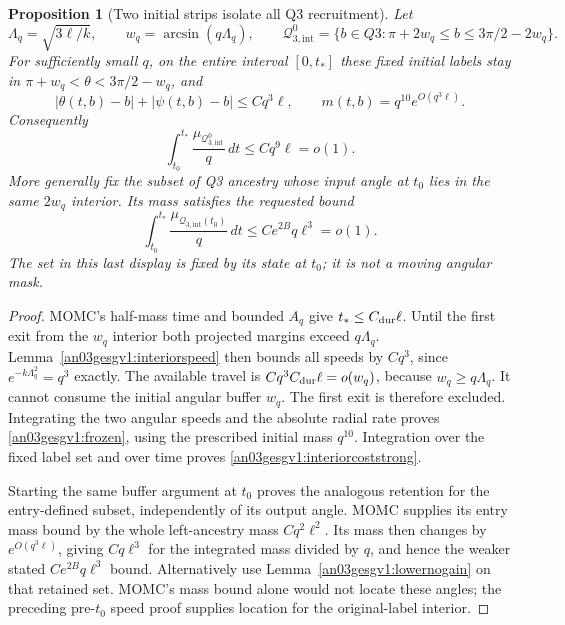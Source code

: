 \documentclass[11pt]{article}
\newtheorem{proposition}{Proposition}[section]
\theoremstyle{remark}\newtheorem{remark}[proposition]{Remark}
\newcommand{\dd}{\,d}
\begin{document}
\begin{proposition}[Two initial strips isolate all Q3 recruitment]
\label{an03gesgv1:Q3split}
Let
\[
 \Lambda_q=\sqrt{3\ell/k},\qquad w_q=\arcsin(q\Lambda_q),\qquad
 \mathcal Q_{3,\mathrm{int}}^0
   =\{b\in Q3:\pi+2w_q\le b\le3\pi/2-2w_q\}.
\]
For sufficiently small $q$, on the entire interval $[0,t_*]$
these fixed initial labels stay in
$\pi+w_q<\theta<3\pi/2-w_q$, and
\begin{equation}
 |\theta(t,b)-b|+|\psi(t,b)-b|\le Cq^3\ell,\qquad
 m(t,b)=q^{10}e^{O(q^3\ell)}.
 \label{an03gesgv1:frozen}
\end{equation}
Consequently
\begin{equation}
 \int_{t_0}^{t_*}\frac{\mu_{\mathcal Q_{3,\mathrm{int}}^0}}q\dd t
 \le Cq^9\ell=o(1).
 \label{an03gesgv1:interiorcoststrong}
\end{equation}
More generally fix the subset of Q3 ancestry whose input
angle at $t_0$ lies in the same $2w_q$ interior. Its mass
satisfies the requested bound
\begin{equation}
 \int_{t_0}^{t_*}\frac{\mu_{\mathcal Q_{3,\mathrm{int}}(t_0)}}q\dd t
 \le C e^{2B}q\ell^3=o(1).
 \label{an03gesgv1:interiorcost}
\end{equation}
The set in this last display is fixed by its state at $t_0$;
it is not a moving angular mask.
\end{proposition}
\begin{proof}
MOMC's half-mass time and bounded $A_q$ give
$t_*\le C_{\rm dur}\ell$. Until the first exit from the
$w_q$ interior both projected margins exceed $q\Lambda_q$.
Lemma~\ref{an03gesgv1:interiorspeed} then bounds all speeds
by $Cq^3$, since $e^{-k\Lambda_q^2}=q^3$ exactly.
The available travel is $Cq^3C_{\rm dur}\ell=o(w_q)$,
because $w_q\ge q\Lambda_q$. It cannot consume the initial
angular buffer $w_q$. The first exit is therefore excluded.
Integrating the two angular speeds and the absolute radial
rate proves \eqref{an03gesgv1:frozen}, using the prescribed
initial mass $q^{10}$. Integration over the fixed label set
and over time proves \eqref{an03gesgv1:interiorcoststrong}.

Starting the same buffer argument at $t_0$ proves the analogous
retention for the entry-defined subset, independently of its
output angle. MOMC supplies its entry mass bound by the whole
left-ancestry mass $Cq^2\ell^2$. Its mass then changes by
$e^{O(q^3\ell)}$, giving $Cq\ell^3$ for the integrated
mass divided by $q$, and hence the weaker stated
$Ce^{2B}q\ell^3$ bound. Alternatively use
Lemma~\ref{an03gesgv1:lowernogain} on that retained set.
MOMC's mass bound alone would not locate these angles;
the preceding pre-$t_0$ speed proof supplies location for
the original-label interior.
\end{proof}
\end{document}

